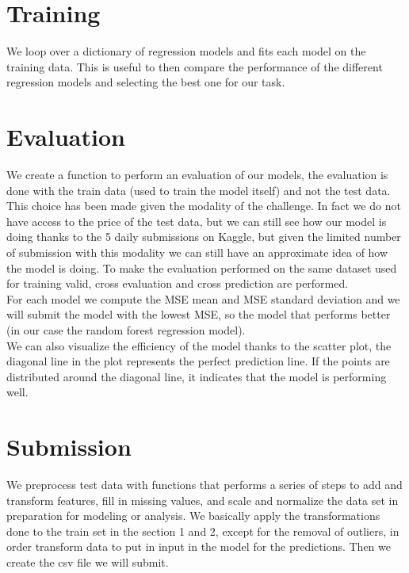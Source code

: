 \documentclass[10pt, notitlepage]{article}
\begin{document}
\color{blue}
\section{Training}
\color{black}
We loop over a dictionary of regression models and fits each model on the training data. This is useful to then compare the performance of the different regression models and selecting the best one for our task.

\color{blue}
\section{Evaluation}
\color{black}
We create a function to perform an evaluation of our models, the evaluation is done with the train data (used to train the model itself) and not the test data. This choice has been made given the modality of the challenge. In fact we do not have access to the price of the test data, but we can still see how our model is doing thanks to the 5 daily submissions on Kaggle, but given the limited number of submission with this modality we can still have an approximate idea of how the model is doing. To make the evaluation performed on the same dataset used for training valid, cross evaluation and cross prediction are performed.
\\
For each model we compute the MSE mean and MSE standard deviation and we will submit the model with the lowest MSE, so the model that performs better (in our case the random forest regression model). 
\\
We can also visualize the efficiency of the model thanks to the scatter plot, the diagonal line in the plot represents the perfect prediction line. If the points are distributed around the diagonal line, it indicates that the model is performing well.

\color{blue}
\section{Submission}
\color{black}
We preprocess test data with functions that performs a series of steps to add and transform features, fill in missing values, and scale and normalize the data set in preparation for modeling or analysis. We basically apply the transformations done to the train set in the section 1 and 2, except for the removal of outliers, in order transform data to put in input in the model for the predictions. Then we create the csv file we will submit.

\color{blue}
\end{document}
